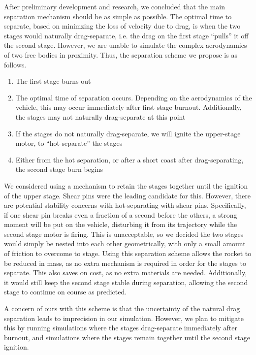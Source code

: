 After preliminary development and research, we concluded that the main separation mechanism should be as simple as possible. The optimal time to separate, based on minimzing the loss of velocity due to drag, is when the two stages would naturally drag-separate, i.e. the drag on the first stage ``pulls'' it off the second stage. However, we are unable to simulate the complex aerodynamics of two free bodies in proximity. Thus, the separation scheme we propose is as follows.

\begin{enumerate}
    \item The first stage burns out
    \item The optimal time of separation occurs. Depending on the aerodynamics of the vehicle, this may occur immediately after first stage burnout. Additionally, the stages may not naturally drag-separate at this point
    \item If the stages do not naturally drag-separate, we will ignite the upper-stage motor, to ``hot-separate'' the stages
    \item Either from the hot separation, or after a short coast after drag-separating, the second stage burn begins
\end{enumerate}

We considered using a mechanism to retain the stages together until the ignition of the upper stage. Shear pins were the leading candidate for this. However, there are potential stability concerns with hot-separating with shear pins. Specifically, if one shear pin breaks even a fraction of a second before the others, a strong moment will be put on the vehicle, disturbing it from its trajectory while the second stage motor is firing. This is unacceptable, so we decided the two stages would simply be nested into each other geometrically, with only a small amount of friction to overcome to stage. Using this separation scheme allows the rocket to be reduced in mass, as no extra mechanism is required in order for the stages to separate. This also saves on cost, as no extra materials are needed. Additionally, it would still keep the second stage stable during separation, allowing the second stage to continue on course as predicted. 

A concern of ours with this scheme is that the uncertainty of the natural drag separation leads to imprecision in our simulation. However, we plan to mitigate this by running simulations where the stages drag-separate immediately after burnout, and simulations where the stages remain together until the second stage ignition.


